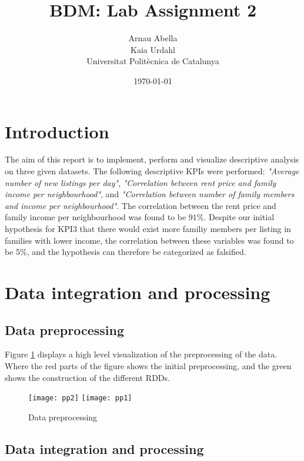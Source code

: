\documentclass[12pt, a4paper]{article}
\title{%
  \vspace{-10ex}
  BDM: Lab Assignment 2
}
\author{%
  Arnau Abella \\
  Kaia Urdahl \\
  \large{Universitat Polit\`ecnica de Catalunya}
}
\date{\today}
\begin{document}
\maketitle

\vspace{5ex}

\section{Introduction}\label{section:intro}

The aim of this report is to implement, perform and visualize descriptive analysis on three given datasets.
The following descriptive KPIs were performed: \emph{"Average number of new listings per day"}, \emph{"Correlation between rent price and family income per neighbourhood"},
and \emph{"Correlation between number of family members and income per neighbourhood"}.
The correlation between the rent price and family income per neighbourhood was found to be $91\%$.
Despite our initial hypothesis for KPI3 that there would exist more familiy members per listing in families with lower income, the correlation between these variables was found to be 5\%, and the hypothesis can therefore be categorized as falsified.

\section{Data integration and processing}

\subsection{Data preprocessing}

Figure \ref{fig:pp1}  displays a high level visualization of the preprocessing of the data.
Where the red parts of the figure shows the initial preprocessing, and the green shows the construction of the different RDDs.

\begin{figure}[H]
\centering
{}
\texttt{[image: pp2]}
\vspace{1cm}
\texttt{[image: pp1]}
\caption{Data preprocessing}
\label{fig:pp1}
\end{figure}

\subsection{Data integration and processing}
\end{document}
